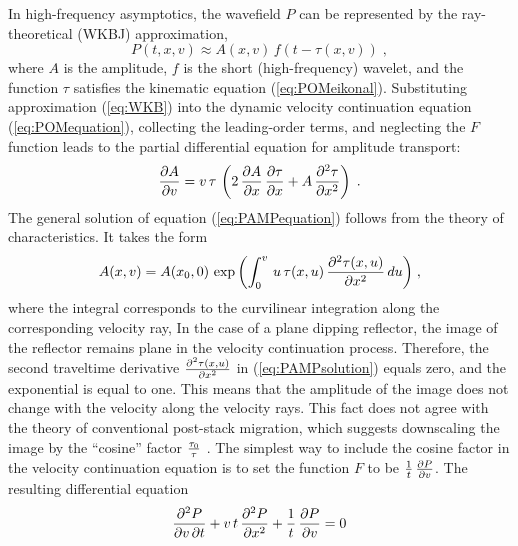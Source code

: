 In high-frequency asymptotics, the wavefield $P$ can be
represented by the ray-theoretical (WKBJ) approximation,
\begin{equation}
P(t,x,v) \approx A(x,v)\,f\left(t - \tau(x,v)\right)\;, 
\label{eq:WKB} 
\end{equation}
where $A$ is the amplitude, $f$ is the short (high-frequency) wavelet,
and the function $\tau$ satisfies the kinematic equation
(\ref{eq:POMeikonal}). Substituting approximation (\ref{eq:WKB}) into
the dynamic velocity continuation equation (\ref{eq:POMequation}),
collecting the leading-order terms, and neglecting the $F$ function
leads to the partial differential equation for amplitude transport:
\begin{equation}
{\partial A \over \partial v} = v\,\tau\,\left(2\,
{\partial A \over \partial x}\,
{\partial \tau \over \partial x} + A\,
{\partial^2 \tau \over \partial x^2}\right)\;.
\label{eq:PAMPequation} 
\end{equation}
The general solution of equation (\ref{eq:PAMPequation}) follows from the
theory of characteristics. It takes the form
\begin{equation}
A(x,v) = A(x_0,0)\,\exp{\left(\int_0^{v}\,u\,\tau(x,u)\,
{\partial^2 \tau(x,u) \over \partial x^2}\,du\right)}\;,
\label{eq:PAMPsolution} 
\end{equation}
where the integral corresponds to the
curvilinear integration along the corresponding velocity ray, 
In the case of a plane dipping reflector, the image of the reflector remains
plane in the velocity continuation process. Therefore, the second
traveltime derivative ${\partial^2 \tau(x,u) \over \partial x^2}$ in
(\ref{eq:PAMPsolution}) equals zero, and the exponential is equal to
one. This means that the amplitude of the image does not change with
the velocity along the velocity rays. This fact does not agree with the
theory of conventional post-stack migration, which suggests
downscaling the image by the ``cosine'' factor $\tau_0 \over
\tau$ \cite[]{GEO46.05.07170733,Levin.sep.48.147}. The simplest way to
include the cosine factor in the velocity continuation equation is to
set the function $F$ to be ${1 \over t}\,{\partial P \over \partial
v}$. The resulting differential equation
\begin{equation}
{{\partial^2 P} \over {\partial v\, \partial t}} +
v\,t\,{{\partial^2 P} \over {\partial x^2}} +
{1 \over t}\,{\partial P \over \partial v} = 0
\label{eq:POMequation2} 
\end{equation}
